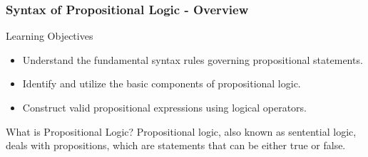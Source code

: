 \documentclass[aspectratio=169]{beamer}
\begin{document}
\begin{frame}[fragile]
    \frametitle{Syntax of Propositional Logic - Overview}
    \begin{block}{Learning Objectives}
        \begin{itemize}
            \item Understand the fundamental syntax rules governing propositional statements.
            \item Identify and utilize the basic components of propositional logic.
            \item Construct valid propositional expressions using logical operators.
        \end{itemize}
    \end{block}
    
    \begin{block}{What is Propositional Logic?}
        Propositional logic, also known as sentential logic, deals with propositions, which are statements that can be either true or false.
    \end{block}
\end{frame}
\end{document}
